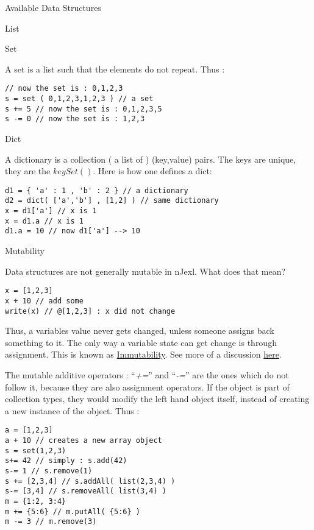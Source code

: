 \begin{section}{Available Data Structures}
\begin{subsection}{List}
\end{subsection}

\begin{subsection}{Set}

A set is a list such that the elements do not repeat.
Thus :

\begin{lstlisting}[style=JexlStyle]
// now the set is : 0,1,2,3
s = set ( 0,1,2,3,1,2,3 ) // a set  
s += 5 // now the set is : 0,1,2,3,5 
s -= 0 // now the set is : 1,2,3
\end{lstlisting}
\end{subsection}

\begin{subsection}{Dict}

A dictionary is a collection ( a list of ) (key,value) pairs.
The keys are unique, they are the $keySet()$. Here is how one defines a dict:

\begin{lstlisting}[style=JexlStyle]
d1 = { 'a' : 1 , 'b' : 2 } // a dictionary   
d2 = dict( ['a','b'] , [1,2] ) // same dictionary  
x = d1['a'] // x is 1
x = d1.a // x is 1 
d1.a = 10 // now d1['a'] --> 10 
\end{lstlisting}
\end{subsection}

\begin{subsection}{Mutability}

Data structures are not generally mutable in nJexl.
What does that mean?
\begin{lstlisting}[style=JexlStyle]
x = [1,2,3]
x + 10 // add some 
write(x) // @[1,2,3] : x did not change
\end{lstlisting}
Thus, a variables value never gets changed, unless someone assigns
back something to it. The only way a variable state can get 
change is through assignment. This is known as \href{https://en.wikipedia.org/wiki/Immutable_object}{Immutability}.
See more of a discussion \href{http://programmers.stackexchange.com/questions/151733/if-immutable-objects-are-good-why-do-people-keep-creating-mutable-objects}{here}.

The mutable additive operators : ``\emph{+=}'' and ``\emph{-=}'' are the ones which do not follow it, because
they are also assignment operators. If the object is part of collection types, they would modify the left hand object itself, 
instead of creating a new instance of the object. Thus :

\begin{lstlisting}[style=JexlStyle]
a = [1,2,3]
a + 10 // creates a new array object  
s = set(1,2,3)
s+= 42 // simply : s.add(42)
s-= 1 // s.remove(1)
s += [2,3,4] // s.addAll( list(2,3,4) )
s-= [3,4] // s.removeAll( list(3,4) )
m = {1:2, 3:4}
m += {5:6} // m.putAll( {5:6} )
m -= 3 // m.remove(3)
\end{lstlisting}

\end{subsection}

\end{section}


